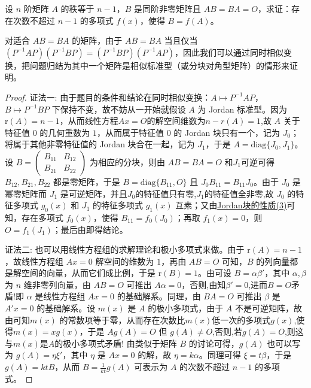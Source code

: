 \documentclass[../../main.tex]{subfiles}
\begin{document}
\begin{proposition}\label{proposition:与秩为n-1的矩阵乘法可交换的矩阵也可被其多项式表示}
设 $n$ 阶矩阵 $A$ 的秩等于 $n - 1$，$B$ 是同阶非零矩阵且 $AB = BA = O$，求证：存在次数不超过 $n - 1$ 的多项式 $f(x)$，使得 $B = f(A)$。
\end{proposition}
\begin{remark}
对适合 $AB = BA$ 的矩阵，由于 $AB = BA$ 当且仅当 $(P^{-1}AP)(P^{-1}BP)=(P^{-1}BP)(P^{-1}AP)$，因此我们可以通过同时相似变换，把问题归结为其中一个矩阵是相似标准型（或分块对角型矩阵）的情形来证明。
\end{remark}
\begin{proof}
{\color{blue}证法一:}
由于题目的条件和结论在同时相似变换：$A\mapsto P^{-1}AP$，$B\mapsto P^{-1}BP$ 下保持不变，故不妨从一开始就假设 $A$ 为 Jordan 标准型。因为 $\mathrm{r}(A)=n - 1$，从而线性方程$Ax=O$的解空间维数为$n-r(A)=1$,故 $A$ 关于特征值 $0$ 的几何重数为 $1$，从而属于特征值 $0$ 的 Jordan 块只有一个，记为 $J_0$；将属于其他非零特征值的 Jordan 块合在一起，记为 $J_1$，于是 $A = \mathrm{diag}\{J_0,J_1\}$。设 $B=\begin{pmatrix}
B_{11} & B_{12} \\
B_{21} & B_{22}
\end{pmatrix}$ 为相应的分块，则由 $AB = BA = O$ 和$J_1$可逆可得 $B_{12},B_{21},B_{22}$ 都是零矩阵，于是 $B = \mathrm{diag}\{B_{11},O\}$ 且 $J_0B_{11}=B_{11}J_0$。由于 $J_0$ 是幂零矩阵而 $J_1$ 是可逆矩阵，并且$J_0$的特征值只有零,$J_1$的特征值全非零,故 $J_0$ 的特征多项式 $g_0(x)$ 和 $J_1$ 的特征多项式 $g_1(x)$ 互素；又由\hyperref[proposition:Jordan块的性质]{Jordan块的性质(3)}可知，存在多项式 $f_0(x)$，使得 $B_{11}=f_0(J_0)$；再取 $f_1(x)=0$，则 $O = f_1(J_1)$；最后由即得结论。

{\color{blue}证法二:}
也可以用线性方程组的求解理论和极小多项式来做。由于 $\mathrm{r}(A)=n - 1$，故线性方程组 $Ax = 0$ 解空间的维数为 $1$，再由 $AB = O$ 可知，$B$ 的列向量都是解空间的向量，从而它们成比例，于是 $\mathrm{r}(B)=1$。由可设 $B = \alpha\beta'$，其中 $\alpha,\beta$ 为 $n$ 维非零列向量，由 $AB = O$ 可推出 $A\alpha = 0$，否则,由知$\beta'=0$,进而$B=O$矛盾!即 $\alpha$ 是线性方程组 $Ax = 0$ 的基础解系。同理，由 $BA = O$ 可推出 $\beta$ 是 $A'x = 0$ 的基础解系。设 $m(x)$ 是 $A$ 的极小多项式，由于 $A$ 不是可逆矩阵，故由可知$m(x)$ 的常数项等于零，从而存在次数比$m(x)$低一次的多项式$g(x)$,使得$m(x)=xg(x)$，于是 $Ag(A)=O$ 但 $g(A)\neq O$,否则,若$g(A)=O$,则这与$m(x)$是$A$的极小多项式矛盾! 由类似于矩阵 $B$ 的讨论可得，$g(A)$ 也可以写为 $g(A)=\eta\xi'$，其中 $\eta$ 是 $Ax = 0$ 的解，故 $\eta = k\alpha$。同理可得 $\xi = t\beta$，于是 $g(A)=ktB$，从而 $B = \frac{1}{kt}g(A)$ 可表示为 $A$ 的次数不超过 $n - 1$ 的多项式。

\end{proof}
\end{document}
